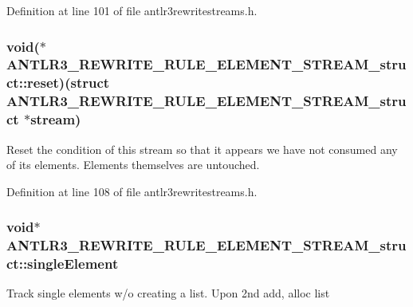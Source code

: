 Definition at line 101 of file antlr3rewritestreams.\-h.

\hypertarget{struct_a_n_t_l_r3___r_e_w_r_i_t_e___r_u_l_e___e_l_e_m_e_n_t___s_t_r_e_a_m__struct_a49e313e9d59d347925773e99afbf3d6e}{
\subsubsection[{reset}]{\setlength{\rightskip}{0pt plus 5cm}void($\ast$ A\-N\-T\-L\-R3\-\_\-\-R\-E\-W\-R\-I\-T\-E\-\_\-\-R\-U\-L\-E\-\_\-\-E\-L\-E\-M\-E\-N\-T\-\_\-\-S\-T\-R\-E\-A\-M\-\_\-struct\-::reset)(struct {\bf A\-N\-T\-L\-R3\-\_\-\-R\-E\-W\-R\-I\-T\-E\-\_\-\-R\-U\-L\-E\-\_\-\-E\-L\-E\-M\-E\-N\-T\-\_\-\-S\-T\-R\-E\-A\-M\-\_\-struct} $\ast$stream)}}\label{struct_a_n_t_l_r3___r_e_w_r_i_t_e___r_u_l_e___e_l_e_m_e_n_t___s_t_r_e_a_m__struct_a49e313e9d59d347925773e99afbf3d6e}
Reset the condition of this stream so that it appears we have not consumed any of its elements. Elements themselves are untouched. 

Definition at line 108 of file antlr3rewritestreams.\-h.

\hypertarget{struct_a_n_t_l_r3___r_e_w_r_i_t_e___r_u_l_e___e_l_e_m_e_n_t___s_t_r_e_a_m__struct_a3d90443fe82f011d5709c84c9add4508}{
\subsubsection[{single\-Element}]{\setlength{\rightskip}{0pt plus 5cm}void$\ast$ A\-N\-T\-L\-R3\-\_\-\-R\-E\-W\-R\-I\-T\-E\-\_\-\-R\-U\-L\-E\-\_\-\-E\-L\-E\-M\-E\-N\-T\-\_\-\-S\-T\-R\-E\-A\-M\-\_\-struct\-::single\-Element}}\label{struct_a_n_t_l_r3___r_e_w_r_i_t_e___r_u_l_e___e_l_e_m_e_n_t___s_t_r_e_a_m__struct_a3d90443fe82f011d5709c84c9add4508}
Track single elements w/o creating a list. Upon 2nd add, alloc list 


